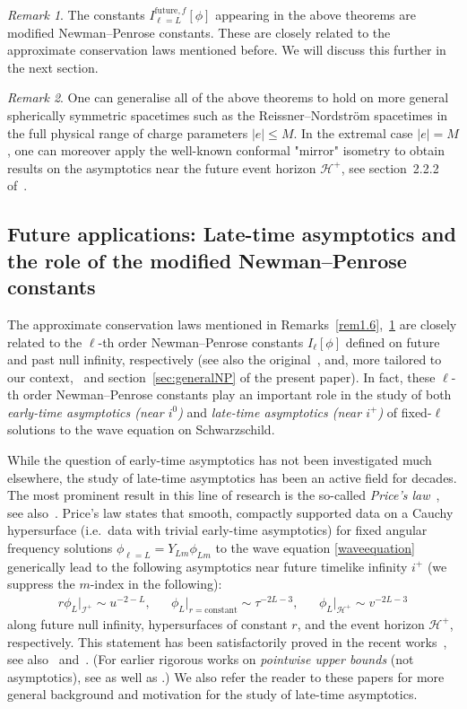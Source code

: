 \documentclass[11pt,english]{article}
\numberwithin{equation}{section}
\theoremstyle{remark}
\newtheorem{rem}{Remark}[section]
\theoremstyle{plain}
\theoremstyle{remark}
\renewcommand{\(}{\left(}
\renewcommand{\)}{\right)}
\begin{document}
\begin{rem}\label{rem1.7}
The constants $I_{\ell=L}^{\mathrm{future},f}[\phi]$ appearing in the above theorems are modified Newman--Penrose constants. These are closely related to the approximate conservation laws mentioned before. We will discuss this further in the next section.
\end{rem}
\begin{rem}
One can generalise all of the above theorems to hold on more general spherically symmetric spacetimes such as the Reissner--Nordstr\"om spacetimes in the full physical range of charge parameters $|e|\leq M$. 
In the extremal case $|e|=M$, one can moreover apply the well-known conformal "mirror" isometry to obtain results on the asymptotics near the future event horizon $\mathcal H^+$, see section~2.2.2 of~\cite{I}.
\end{rem}


\subsection{Future applications: Late-time asymptotics and the role of the modified Newman--Penrose constants} \label{sec:intro:NP}
The approximate conservation laws mentioned in Remarks~\ref{rem1.6},~\ref{rem1.7} are closely related to the $\ell$-th order Newman--Penrose constants  $I_\ell[\phi]$ defined on future and past null infinity, respectively
 (see also the original~\cite{NPconstants65,NPconstants68}, and, more tailored to our context,~\cite{AAG18b,AAG21} and section~\ref{sec:generalNP} of the present paper). 
In fact, these $\ell$-th order Newman--Penrose constants play an important role in the study of both  \textit{early-time asymptotics (near $i^0$)} and \textit{late-time asymptotics (near $i^+$)} of fixed-$\ell$ solutions to the wave equation on Schwarzschild. 

While the question of early-time asymptotics has not been investigated much elsewhere, the study of late-time asymptotics has been an active field for decades. 
The most prominent result in this line of research is the so-called \emph{Price's law}~\cite{Price72,GPP94}, see also~\cite{Leaver86}. 
Price's law states that smooth, compactly supported data on a Cauchy hypersurface (i.e.\ data with trivial early-time asymptotics) for fixed angular frequency solutions $\phi_{\ell=L}=Y_{Lm}\phi_{Lm}$ to the wave equation \eqref{waveequation}  generically lead to the following asymptotics near future timelike infinity $i^+$ (we suppress the $m$-index in the following):
\begin{align}\label{eq:Price}
r\phi_L|_{\mathcal I^+}\sim u^{-2-L}, &&\phi_L|_{r=\text{constant}}\sim \tau^{-2L-3}, &&\phi_L|_{\mathcal H^+}\sim v^{-2L-3}
\end{align}
along future null infinity, hypersurfaces of constant $r$, and the event horizon $\mathcal H^+$, respectively. 
This statement has been satisfactorily proved in the recent works~\cite{AAG18a,AAG18b, AAG21}, see also~\cite{Hintz22} and~\cite{MZ21}. (For earlier rigorous works on \textit{pointwise upper bounds} (not asymptotics), see \cite{DSS11,DSS12} as well as  \cite{MTT12}.)
We also refer the reader to these papers for more general background and motivation for the study of late-time asymptotics. 
\end{document}
